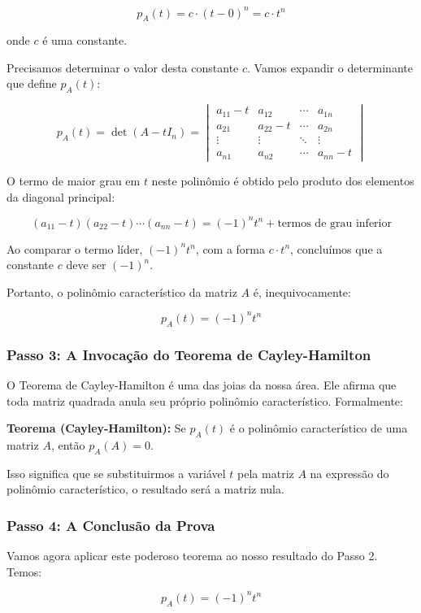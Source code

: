 \[
p_A(t) = c \cdot (t-0)^n = c \cdot t^n
\]

onde $c$ é uma constante.

Precisamos determinar o valor desta constante $c$. Vamos expandir o determinante que define $p_A(t)$:

\[
p_A(t) = \det(A - tI_n) =
\begin{vmatrix}
a_{11} - t & a_{12} & \cdots & a_{1n} \\
a_{21} & a_{22} - t & \cdots & a_{2n} \\
\vdots & \vdots & \ddots & \vdots \\
a_{n1} & a_{n2} & \cdots & a_{nn} - t
\end{vmatrix}
\]

O termo de maior grau em $t$ neste polinômio é obtido pelo produto dos elementos da diagonal
principal:

\[
(a_{11} - t)(a_{22} - t)\cdots(a_{nn} - t) = (-1)^n t^n + \text{termos de grau inferior}
\]

Ao comparar o termo líder, $(-1)^n t^n$, com a forma $c \cdot t^n$, concluímos que a constante $c$ deve ser
$(-1)^n$.

Portanto, o polinômio característico da matriz $A$ é, inequivocamente:

\[
p_A(t) = (-1)^n t^n
\]

\subsubsection*{Passo 3: A Invocação do Teorema de Cayley-Hamilton}

O Teorema de Cayley-Hamilton é uma das joias da nossa área. Ele afirma que toda matriz quadrada
anula seu próprio polinômio característico. Formalmente:

\textbf{Teorema (Cayley-Hamilton):} Se $p_A(t)$ é o polinômio característico de uma matriz $A$, então
$p_A(A) = 0$.

Isso significa que se substituirmos a variável $t$ pela matriz $A$ na expressão do polinômio
característico, o resultado será a matriz nula.

\subsubsection*{Passo 4: A Conclusão da Prova}

Vamos agora aplicar este poderoso teorema ao nosso resultado do Passo 2. Temos:

\[
p_A(t) = (-1)^n t^n
\]

